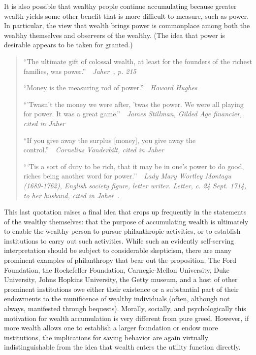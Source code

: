 \documentclass[titlepage,12pt]{article}
\begin{document}
It is also possible that wealthy people continue accumulating because 
greater wealth yields some other benefit that is more difficult to 
measure, such as power.  In particular, the view that wealth 
brings power is commonplace among both the wealthy themselves and 
observers of the wealthy.  (The idea that power is desirable appears 
to be taken for granted.)

\begin{quote}
``The ultimate gift of colossal wealth, at least for the founders of the 
richest families, was power.''~~\emph{Jaher~\citeyear{jaher:gilded}, p.  215}

``Money is the measuring rod of power.''~~\emph{Howard Hughes}

``'Twasn't the money we were after, 'twas the power.  We were all 
playing for power.  It was a great game.''~~\emph{James Stillman, Gilded 
Age financier, cited in Jaher~\citeyear{jaher:gilded}}

``If you give away the surplus [money], you give away the 
control.''~~\emph{Cornelius Vanderbilt, cited in 
Jaher~\citeyear{jaher:gilded}}

```Tis a sort of duty to be rich, that it may be in one's power to do 
good, riches being another word for power.''~~\emph{Lady Mary Wortley 
Montagu (1689-1762), English society figure, letter writer.  Letter, 
c.  24 Sept.  1714, to her husband, cited in Jaher~\citeyear{jaher:gilded}.}
\end{quote}

This last quotation raises a final idea that crops up frequently in 
the statements of the wealthy themselves: that the purpose of 
accumulating wealth is ultimately to enable the wealthy person to 
pursue philanthropic activities, or to establish institutions to carry 
out such activities.  While such an evidently self-serving 
interpretation should be subject to considerable skepticism, there are 
many prominent examples of philanthropy that bear out the proposition.  
The Ford Foundation, the Rockefeller Foundation, Carnegie-Mellon 
University, Duke University, Johns Hopkins University, the Getty 
museum, and a host of other prominent institutions owe either their 
existence or a substantial part of their endowments to the munificence 
of wealthy individuals (often, although not always, manifested through 
bequests).  Morally, socially, and psychologically this motivation for 
wealth accumulation is very different from pure greed.  However, if 
more wealth allows one to establish a larger foundation or endow more 
institutions, the implications for saving behavior are again virtually 
indistinguishable from the idea that wealth enters the utility 
function directly.
\end{document}
